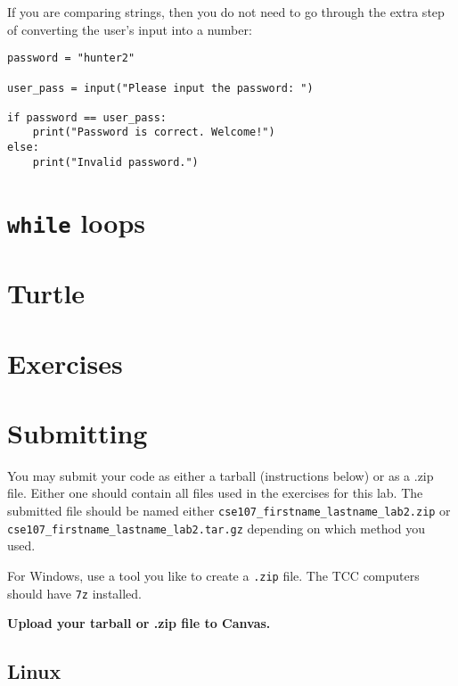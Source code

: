 \documentclass[12pt,hidelinks]{article}
\begin{document}
If you are comparing strings, then you do not need to go through the extra step of converting the user's input into a number:

\begin{lstlisting}[style=python]
password = "hunter2"

user_pass = input("Please input the password: ")

if password == user_pass:
    print("Password is correct. Welcome!")
else:
    print("Invalid password.")
\end{lstlisting}


\section{\texttt{while} loops}

\section{Turtle}

\pagebreak
\section{Exercises}

\pagebreak
\section{Submitting}

You may submit your code as either a tarball (instructions below) or as a .zip
file. Either one should contain all files used in the exercises for this lab.
The submitted file should be named either
\texttt{cse107\_firstname\_lastname\_lab2.zip} or
\texttt{cse107\_firstname\_lastname\_lab2.tar.gz} depending on which method you
used.

For Windows, use a tool you like to create a \texttt{.zip} file. The TCC computers should
have \texttt{7z} installed.

\begin{center}
  \textbf{Upload your tarball or .zip file to Canvas.}
\end{center}

\subsection{Linux}
\end{document}
